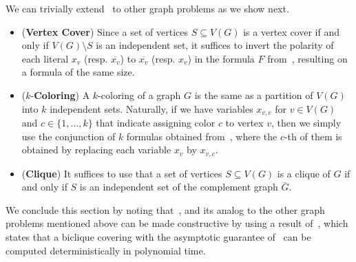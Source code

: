 \documentclass[11pt]{article}
\newtheorem{definition}[theorem]{Definition}
\begin{document}
We can trivially extend~ to other graph problems as we show next.
\begin{itemize}
    \item (\textbf{Vertex Cover}) Since a set of vertices $S \subseteq V(G)$ is a vertex cover if and only if $V(G) \setminus S$ is an independent set, it suffices to invert the polarity of each literal $x_v$ (resp. $\overline{x_v}$) to $\overline{x_v}$ (resp. $x_v$) in the formula $F$ from~, resulting on a formula of the same size.
    \item ($k$-\textbf{Coloring}) A $k$-coloring of a graph $G$ is the same as a partition of $V(G)$ into $k$ independent sets. Naturally, if we have variables $x_{v, c}$ for $v \in V(G)$ and $c \in \{1, \ldots, k\}$ that indicate assigning color $c$ to vertex $v$, then we simply use the conjunction of $k$ formulas obtained from~, where the $c$-th of them is obtained by replacing each variable $x_v$ by $x_{v, c}$.
    \item (\textbf{Clique}) It suffices to use that a set of vertices $S \subseteq V(G)$ is a clique of $G$ if and only if $S$ is an independent set of the complement graph $\overline{G}$. %
\end{itemize}

We conclude this section by noting that~, and its analog to the other graph problems mentioned above can be made constructive by using a result of~\citet{mubayiFindingBipartiteSubgraphs2010}, which states that a biclique covering with the asymptotic guarantee of~ can be computed deterministically in polynomial time.
\end{document}
